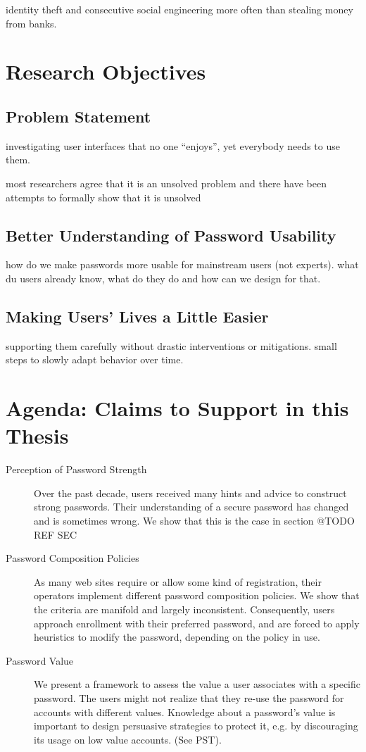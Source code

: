 identity theft and consecutive social engineering more often than stealing money from banks.


\section{Research Objectives}

\subsection{Problem Statement}
investigating user interfaces that no one ``enjoys'', yet everybody needs to use them. 

most researchers agree that it is an unsolved problem and there have been attempts to formally show that it is unsolved 

\subsection{Better Understanding of Password Usability}
how do we make passwords more usable for mainstream users (not experts). what du users already know, what do they do and how can we design for that. 

\subsection{Making Users' Lives a Little Easier}
supporting them carefully without drastic interventions or mitigations. small steps to slowly adapt behavior over time. 

\section{Agenda: Claims to Support in this Thesis}

\begin{description}
\item[Perception of Password Strength] Over the past decade, users received many hints and advice to construct strong passwords. Their understanding of a secure password has changed and is sometimes wrong. We show that this is the case in section @TODO REF SEC

\item[Password Composition Policies] As many web sites require or allow some kind of registration, their operators implement different password composition policies. We show that the criteria are manifold and largely inconsistent. Consequently, users approach enrollment with their preferred password, and are forced to apply heuristics to modify the password, depending on the policy in use. 

\item[Password Value] We present a framework to assess the value a user associates with a specific password. The users might not realize that they re-use the password for accounts with different values. Knowledge about a password's value is important to design persuasive strategies to protect it, e.g. by discouraging its usage on low value accounts. (See PST).
\end{description}


